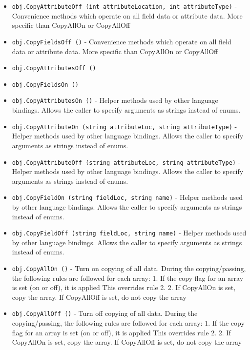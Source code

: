 \begin{itemize}
\item  \verb|obj.CopyAttributeOff (int attributeLocation, int attributeType)| -  Convenience methods which operate on all field data or 
 attribute data.  More specific than CopyAllOn or CopyAllOff

\item  \verb|obj.CopyFieldsOff ()| -  Convenience methods which operate on all field data or 
 attribute data.  More specific than CopyAllOn or CopyAllOff

\item  \verb|obj.CopyAttributesOff ()|

\item  \verb|obj.CopyFieldsOn ()|

\item  \verb|obj.CopyAttributesOn ()| -  Helper methods used by other language bindings. Allows the caller to
 specify arguments as strings instead of enums.

\item  \verb|obj.CopyAttributeOn (string attributeLoc, string attributeType)| -  Helper methods used by other language bindings. Allows the caller to
 specify arguments as strings instead of enums.

\item  \verb|obj.CopyAttributeOff (string attributeLoc, string attributeType)| -  Helper methods used by other language bindings. Allows the caller to
 specify arguments as strings instead of enums.

\item  \verb|obj.CopyFieldOn (string fieldLoc, string name)| -  Helper methods used by other language bindings. Allows the caller to
 specify arguments as strings instead of enums.

\item  \verb|obj.CopyFieldOff (string fieldLoc, string name)| -  Helper methods used by other language bindings. Allows the caller to
 specify arguments as strings instead of enums.

\item  \verb|obj.CopyAllOn ()| -  Turn on copying of all data.
 During the copying/passing, the following rules are followed for each
 array:
 1. If the copy flag for an array is set (on or off), it is applied
    This overrides rule 2.
 2. If CopyAllOn is set, copy the array.
    If CopyAllOff is set, do not copy the array

\item  \verb|obj.CopyAllOff ()| -  Turn off copying of all data.
 During the copying/passing, the following rules are followed for each
 array:
 1. If the copy flag for an array is set (on or off), it is applied
    This overrides rule 2.
 2. If CopyAllOn is set, copy the array.
    If CopyAllOff is set, do not copy the array

\end{itemize}

